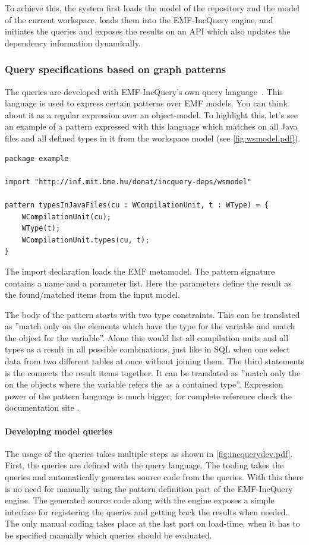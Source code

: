 To achieve this, the system first loads the model of the repository and the 
model of the current workspace, loads them into the EMF-IncQuery engine, 
and initiates the queries and exposes the results on an API which also updates
the dependency information dynamically.
 
\subsubsection{Query specifications based on graph patterns}
The queries are developed with EMF-IncQuery's own query
language~\cite{icmt2011}. This language is used to express certain patterns over
EMF models. You can think about it as a regular expression over an object-model.
To highlight this, let's see an example of a pattern expressed with this
language which matches on all Java files and all defined types in it from the
workspace model (see \autoref{fig:wsmodel.pdf}).
\begin{lstlisting}
package example

import "http://inf.mit.bme.hu/donat/incquery-deps/wsmodel"

pattern typesInJavaFiles(cu : WCompilationUnit, t : WType) = {
	WCompilationUnit(cu);
	WType(t);
	WCompilationUnit.types(cu, t);
}
\end{lstlisting}

The import declaration loads the EMF metamodel. The pattern signature
contains a name and a parameter list. Here the parameters define the result as
the found/matched items from the input model. 

The body of the pattern starts with two type constraints. This can be translated
as ''match only on the elements which have the  type for
the  variable and match the  object for the 
variable''. Alone this would list all compilation units and all types as a
result in all possible combinations, just like in SQL when one select data from
two different tables at once without joining them. The third statements is the
connects the result items together. It can be translated as ''match only the on
the objects  where the  variable refers the  as a contained
type''. Expression power of the pattern language is much bigger; for complete
reference check the documentation site \cite{EMFIncQuery}.

\paragraph{Developing model queries}
The usage of the queries takes multiple steps as shown in \autoref{fig:incquerydev.pdf}.
First, the queries are defined with the query language. The tooling takes the queries 
and automatically generates source code from the queries. With this there is no need 
for manually using the pattern definition part of the EMF-IncQuery engine. The generated
source code along with the engine exposes a simple interface for registering the
queries and getting back the results when needed. The only manual coding takes place
at the last part on load-time, when it has to be specified manually which queries 
should be evaluated. 

